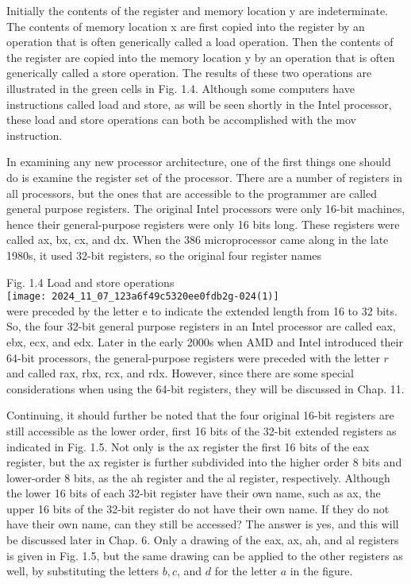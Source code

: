 \documentclass[10pt]{article}
\begin{document}
Initially the contents of the register and memory location y are indeterminate. The contents of memory location x are first copied into the register by an operation that is often generically called a load operation. Then the contents of the register are copied into the memory location y by an operation that is often generically called a store operation. The results of these two operations are illustrated in the green cells in Fig. 1.4. Although some computers have instructions called load and store, as will be seen shortly in the Intel processor, these load and store operations can both be accomplished with the mov instruction.

In examining any new processor architecture, one of the first things one should do is examine the register set of the processor. There are a number of registers in all processors, but the ones that are accessible to the programmer are called general purpose registers. The original Intel processors were only 16-bit machines, hence their general-purpose registers were only 16 bits long. These registers were called ax, bx, cx, and dx. When the 386 microprocessor came along in the late 1980s, it used 32-bit registers, so the original four register names

Fig. 1.4 Load and store operations\\
\texttt{[image: 2024\_11\_07\_123a6f49c5320ee0fdb2g-024(1)]}\\
were preceded by the letter e to indicate the extended length from 16 to 32 bits. So, the four 32-bit general purpose registers in an Intel processor are called eax, ebx, ecx, and edx. Later in the early 2000s when AMD and Intel introduced their 64-bit processors, the general-purpose registers were preceded with the letter $r$ and called rax, rbx, rcx, and rdx. However, since there are some special considerations when using the 64-bit registers, they will be discussed in Chap. 11.

Continuing, it should further be noted that the four original 16-bit registers are still accessible as the lower order, first 16 bits of the 32-bit extended registers as indicated in Fig. 1.5. Not only is the ax register the first 16 bits of the eax register, but the ax register is further subdivided into the higher order 8 bits and lower-order 8 bits, as the ah register and the al register, respectively. Although the lower 16 bits of each 32-bit register have their own name, such as ax, the upper 16 bits of the 32-bit register do not have their own name. If they do not have their own name, can they still be accessed? The answer is yes, and this will be discussed later in Chap. 6. Only a drawing of the eax, ax, ah, and al registers is given in Fig. 1.5, but the same drawing can be applied to the other registers as well, by substituting the letters $b, c$, and $d$ for the letter $a$ in the figure.
\end{document}
